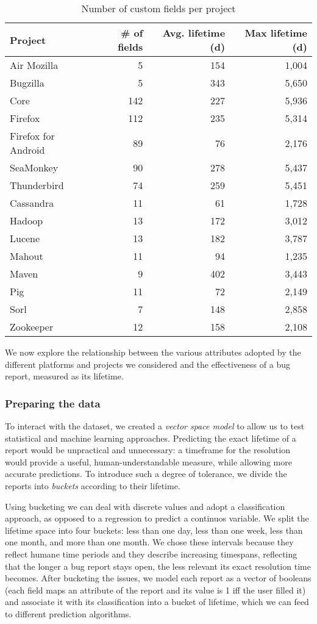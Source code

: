 \begin{table}[ht]\small
\centering
\caption{Number of custom fields per project}
\begin{tabular}{l|rrr}
\rowcolor{tableheader}\textbf{Project} & \textbf{\# of fields} & \textbf{Avg.
lifetime (d)} & \textbf{Max lifetime (d)} \\
 \hline
Air Mozilla & 5 & 154 & 1,004 \\
Bugzilla & 5 & 343 & 5,650 \\
Core & 142 & 227 & 5,936 \\
Firefox & 112 & 235 & 5,314 \\
Firefox for Android & 89 & 76 & 2,176 \\
SeaMonkey & 90 & 278 & 5,437 \\
Thunderbird & 74 & 259 & 5,451 \\
\hline
Cassandra & 11 & 61 & 1,728 \\
Hadoop & 13 & 172 & 3,012 \\
Lucene & 13 & 182 & 3,787 \\
Mahout & 11 & 94 & 1,235 \\
Maven & 9 & 402 & 3,443 \\
Pig & 11 & 72 & 2,149 \\
Sorl & 7 & 148 & 2,858 \\
Zookeeper & 12 & 158 & 2,108 \\
\hline
\end{tabular}
\label{tab:project-fields}
\end{table}


We now explore the relationship between the various attributes adopted by the different platforms and projects we considered and the effectiveness of a bug report, measured as its lifetime.


\subsubsection{Preparing the data} To interact with the dataset, we created a \emph{vector space model} to allow us to test statistical and machine learning approaches.
Predicting the exact lifetime of a report would be unpractical and unnecessary: a timeframe for the resolution would provide a useful, human-understandable measure, while allowing more accurate predictions.
To introduce such a degree of tolerance, we divide the reports into \emph{buckets} according to their lifetime.

 Using bucketing we can deal with discrete values and adopt a classification approach, as opposed to a regression to predict a continuos variable.
We split the lifetime space into four buckets: less than one day, less than one week, less than one month, and more than one month.
We chose these intervals because they reflect humane time periods and they describe increasing timespans, reflecting that the longer a bug report stays open, the less relevant its exact resolution time becomes.
After bucketing the issues, we model each report as a vector of booleans (each field maps an attribute of the report and its value is 1 iff the user filled it) and associate it with its classification into a bucket of lifetime, which we can feed to different prediction algorithms.


